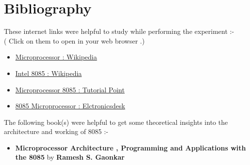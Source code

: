 \documentclass[14pt]{article}
\begin{document}
\section{Bibliography}
\vspace{2em}
These internet links were helpful to study while performing the experiment :-\\
( Click on them to open in your web browser .)
\vspace{1em}
\begin{itemize}
	\item{\href{https://en.m.wikipedia.org/wiki/Microprocessor}{Microprocessor : Wikipedia}}
	\item{\href{https://en.m.wikipedia.org/wiki/Intel_8085}{Intel 8085 : Wikipedia}}
	\item{\href{https://www.tutorialspoint.com/microprocessor/microprocessor_8085_architecture.htm}{Microprocessor 8085 : Tutorial Point}}
	\item{\href{https://electronicsdesk.com/8085-microprocessor.html}{8085 Microprocessor : Elctronicsdesk}}
\end{itemize}
\vspace{2em}
The following book(s) were helpful to get some theoretical insights into the architecture and working of 8085 :-
\begin{itemize}
	\item{\textbf{Microprocessor Architecture , Programming and Applications with the 8085} by \textbf{Ramesh S. Gaonkar}}
\end{itemize}
\end{document}
